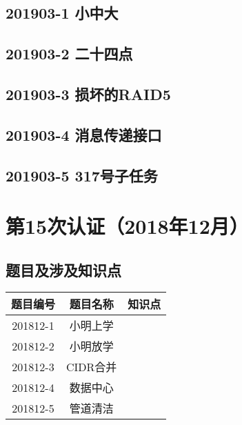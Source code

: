\documentclass[cn,10pt,math=newtx,citestyle=gb7714-2015,bibstyle=gb7714-2015]{elegantbook}
\newif\ifonlyanalyze %
\begin{document}
\newpage
\section{201903-1 小中大}
\ifonlyanalyze
\else
    
\fi


\newpage
\section{201903-2 二十四点}
\ifonlyanalyze
\else
    
\fi


\newpage
\section{201903-3 损坏的RAID5}
\ifonlyanalyze
\else
    
\fi


\newpage
\section{201903-4 消息传递接口}
\ifonlyanalyze
\else
    
\fi


\newpage
\section{201903-5 317号子任务}
\ifonlyanalyze
\else
    
\fi



\chapter{第15次认证（2018年12月）}

\section{题目及涉及知识点}

\begin{table}[htbp]
    \centering
    \begin{tabular}{ccc}
        \toprule
        题目编号 & 题目名称 & 知识点 \\
        \midrule
        201812-1 & 小明上学 &        \\
        201812-2 & 小明放学 &        \\
        201812-3 & CIDR合并 &        \\
        201812-4 & 数据中心 &        \\
        201812-5 & 管道清洁 &        \\
        \bottomrule
    \end{tabular}
\end{table}
\end{document}
